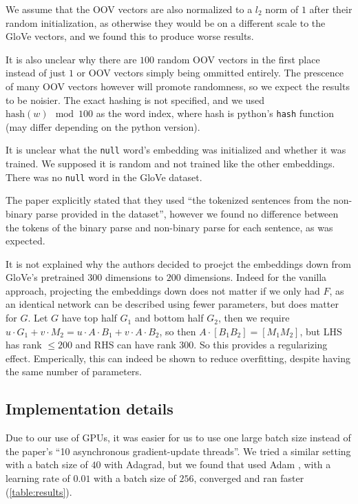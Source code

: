 \documentclass{article}
\begin{document}
We assume that the OOV vectors are also normalized to a $l_2$ norm of $1$ after their random initialization, as otherwise they would be on a different scale to the GloVe vectors, and we found this to produce worse results.

It is also unclear why there are $100$ random OOV vectors in the first place instead of just $1$ or OOV vectors simply being ommitted entirely. The prescence of many OOV vectors however will promote randomness, so we expect the results to be noisier. The exact hashing is not specified, and we used $\text{hash}(w) \mod 100$ as the word index, where hash is python's \texttt{hash} function (may differ depending on the python version).

It is unclear what the \texttt{null} word's embedding was initialized and whether it was trained. We supposed it is random and not trained like the other embeddings. There was no \texttt{null} word in the GloVe dataset.

The paper explicitly stated that they used ``the tokenized sentences from the non-binary parse provided in the dataset'', however we found no difference between the tokens of the binary parse and non-binary parse for each sentence, as was expected.

It is not explained why the authors decided to proejct the embeddings down from GloVe's pretrained $300$ dimensions to $200$ dimensions. Indeed for the vanilla approach, projecting the embeddings down does not matter if we only had $F$, as an identical network can be described using fewer parameters, but does matter for $G$. Let $G$ have top half $G_1$ and bottom half $G_2$, then we require $u\cdot G_1 + v\cdot M_2 = u\cdot A\cdot B_1 + v\cdot A\cdot B_2$, so then $A\cdot [B_1 B_2] = [M_1 M_2]$, but LHS has rank $\le 200$ and RHS can have rank $300$. So this provides a regularizing effect. Emperically, this can indeed be shown to reduce overfitting, despite having the same number of parameters.

\subsection{Implementation details}
Due to our use of GPUs, it was easier for us to use one large batch size instead of the paper's ``10 asynchronous gradient-update threads''. We tried a similar setting with a batch size of $40$ with Adagrad, but we found that used Adam \citep{kingma_adam:_2014}, with a learning rate of $0.01$ with a batch size of $256$, converged and ran faster (\autoref{table:results}).
\end{document}
